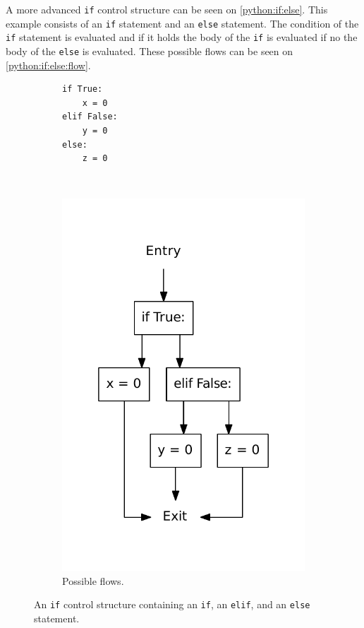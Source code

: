 A more advanced \texttt{if} control structure can be seen on \cref{python:if:else}.
This example consists of an \texttt{if} statement and an \texttt{else} statement.
The condition of the \texttt{if} statement is evaluated and if it holds the body of the \texttt{if} is evaluated if no the body of the \texttt{else} is evaluated.
These possible flows can be seen on \cref{python:if:else:flow}.


\begin{figure}
  \centering
  \begin{subfigure}[b]{0.4\textwidth}
    \begin{lstlisting}[style=python, caption={Code example.}, label={python:if:elif:code}]
if True:
    x = 0
elif False:
    y = 0
else:
    z = 0
    \end{lstlisting}
  \end{subfigure}
  ~ %
  \begin{subfigure}[b]{0.4\textwidth}
    \centering
    \includegraphics[scale=.5]{./figures/if_else_elif.pdf}
    \caption{Possible flows.}
    \label{python:if:elif:flow}
  \end{subfigure}
  \caption{An \texttt{if} control structure containing an \texttt{if}, an \texttt{elif}, and an \texttt{else} statement.}
  \label{python:if:elif}
\end{figure}


